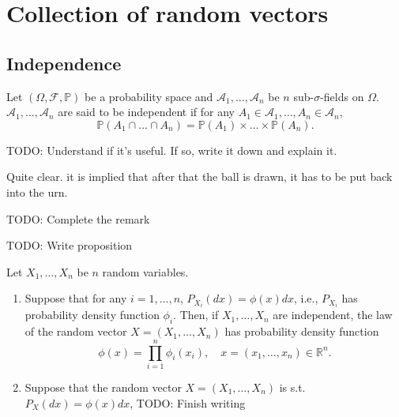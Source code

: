 \chapter{Collection of random vectors}%
\label{cha:Collection of random vectors}

\section{Independence}%
\label{sec:Independence}

\begin{definition}
    \label{def:11.1}
    Let $(\Omega, \mathcal{F}, \mathbb{P})$ be a probability space and $\mathcal{A}_1, \ldots,
    \mathcal{A}_n$ be $n$ sub-$\sigma$-fields on $\Omega$. $\mathcal{A}_1, \ldots, \mathcal{A}_n$
    are said to be independent if for any $A_1 \in \mathcal{A}_1, \ldots, A_n \in \mathcal{A}_n$,
    \[
    \mathbb{P}(A_1 \cap \ldots \cap A_n) = \mathbb{P}(A_1)\times \ldots \times \mathbb{P}(A_n)
    .\] 
\end{definition}

\begin{definition}[]
    \label{def:11.2}
    TODO: Understand if it's useful. If so, write it down and explain it.
\end{definition}

\begin{example}[]
    \label{ex:11.1}
    Quite clear. it is implied that after that the ball is drawn, it has to be put back into
    the urn.
\end{example}

\begin{remark}[]
    \label{rem:11.4}
    TODO: Complete the remark
\end{remark}

\begin{proposition}[]
    \label{prop:11.1}
    TODO: Write proposition
\end{proposition}

\begin{proposition}[]
    \label{prop:11.4}
    Let $X_1, \ldots, X_n $ be $n $ random variables.
    \begin{enumerate}[label=(\roman*)]
        \item Suppose that for any $i=1, \ldots, n $, $P_{X_i}(dx) = \phi(x)dx$, i.e.,
            $P_{X_i} $ has probability density function $\phi_i $. Then, if $X_1, \ldots, X_n $ 
            are independent, the law of the random vector $X = (X_1, \ldots, X_n) $ has 
            probability density function
            \[
            \phi(x) = \prod_{i=1}^{n} \phi_i(x_{i}), 
            \quad x=(x_1, \ldots, x_{n}) \in \mathbb{R}^{n}
            .\] 
        \item Suppose that the random vector $X=(X_1, \ldots, X_n) $ is s.t.
            $P_X(dx) = \phi(x)dx $, TODO: Finish writing

    \end{enumerate}
\end{proposition}

